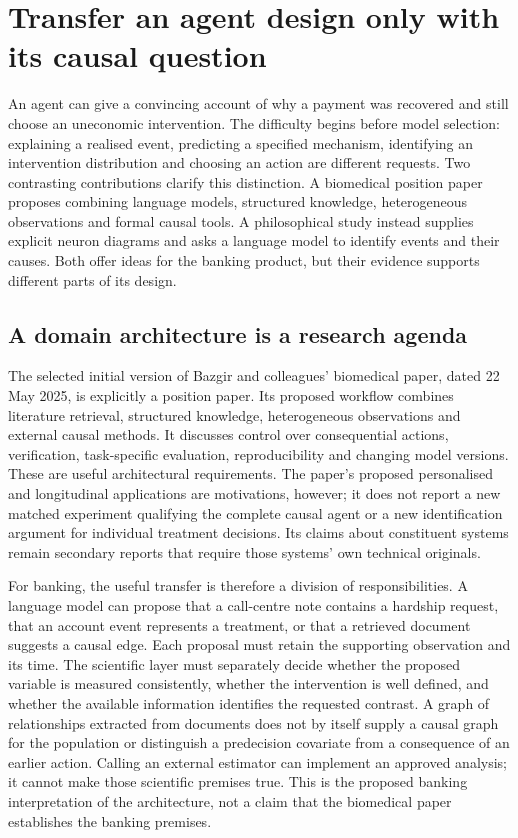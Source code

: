 \section{Transfer an agent design only with its causal question}
\label{exec18:reasoning-transfer}
An agent can give a convincing account of why a payment was recovered and
still choose an uneconomic intervention. The difficulty begins before model
selection: explaining a realised event, predicting a specified mechanism,
identifying an intervention distribution and choosing an action are different
requests. Two contrasting contributions clarify this distinction. A biomedical
position paper proposes combining language models, structured knowledge,
heterogeneous observations and formal causal tools. A philosophical study
instead supplies explicit neuron diagrams and asks a language model to identify
events and their causes. Both offer ideas for the banking product, but their
evidence supports different parts of its design.\citep{exec18_reasoning_biomedical,exec18_reasoning_neuron}

\subsection{A domain architecture is a research agenda}
The selected initial version of Bazgir and colleagues' biomedical paper,
dated 22 May 2025, is explicitly a position paper. Its proposed workflow
combines literature retrieval, structured knowledge, heterogeneous observations
and external causal methods. It discusses control over consequential actions,
verification, task-specific evaluation, reproducibility and changing model
versions. These are useful architectural requirements. The paper's proposed
personalised and longitudinal applications are motivations, however; it does
not report a new matched experiment qualifying the complete causal agent or a
new identification argument for individual treatment decisions. Its claims
about constituent systems remain secondary reports that require those systems'
own technical originals.\citep{exec18_reasoning_biomedical}

For banking, the useful transfer is therefore a division of responsibilities.
A language model can propose that a call-centre note contains a hardship
request, that an account event represents a treatment, or that a retrieved
document suggests a causal edge. Each proposal must retain the supporting
observation and its time. The scientific layer must separately decide whether
the proposed variable is measured consistently, whether the intervention is
well defined, and whether the available information identifies the requested
contrast. A graph of relationships extracted from documents does not by itself
supply a causal graph for the population or distinguish a predecision
covariate from a consequence of an earlier action. Calling an external
estimator can implement an approved analysis; it cannot make those scientific
premises true. This is the proposed banking interpretation of the architecture,
not a claim that the biomedical paper establishes the banking premises.

